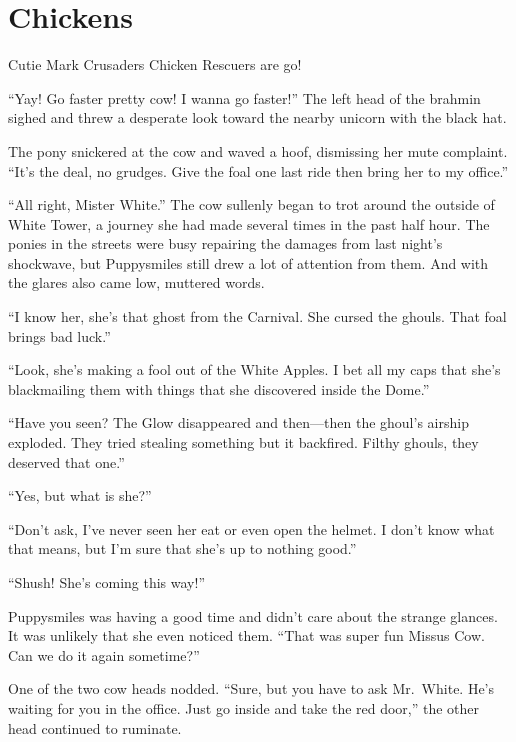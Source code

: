 
\chapter{Chickens}


\begin{intro}
Cutie Mark Crusaders Chicken Rescuers are go!
\end{intro}



``Yay! Go faster pretty cow! I wanna go faster!'' The left head of the brahmin sighed and threw a desperate look toward the nearby unicorn with the black hat.

The pony snickered at the cow and waved a hoof, dismissing her mute complaint. ``It's the deal, no grudges. Give the foal one last ride then bring her to my office.''

``All right, Mister White.'' The cow sullenly began to trot around the outside of White Tower, a journey she had made several times in the past half hour. The ponies in the streets were busy repairing the damages from last night's shockwave, but Puppysmiles still drew a lot of attention from them. And with the glares also came low, muttered words.

``I know her, she's that ghost from the Carnival. She cursed the ghouls. That foal brings bad luck.''

``Look, she's making a fool out of the White Apples. I bet all my caps that she's blackmailing them with things that she discovered inside the Dome.''

``Have you seen? The Glow disappeared and then---then the ghoul's airship exploded. They tried stealing something but it backfired. Filthy ghouls, they deserved that one.''

``Yes, but what is she?''

``Don't ask, I've never seen her eat or even open the helmet. I don't know what that means, but I'm sure that she's up to nothing good.''

``Shush! She's coming this way!''

Puppysmiles was having a good time and didn't care about the strange glances. It was unlikely that she even noticed them. ``That was super fun Missus Cow. Can we do it again sometime?''

One of the two cow heads nodded. ``Sure, but you have to ask Mr.~White. He's waiting for you in the office. Just go inside and take the red door,'' the other head continued to ruminate.

